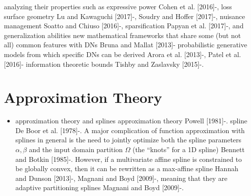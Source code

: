\documentclass{article}
\begin{document}
\begin{itemize}
		\subitem analyzing their properties such as expressive power Cohen et al. [2016]-\cite{balestriero_mad_2018}, loss surface geometry Lu and Kawaguchi [2017]-\cite{balestriero_mad_2018}, Soudry and Hoffer [2017]-\cite{balestriero_mad_2018}, nuisance management Soatto and Chiuso [2016]-\cite{balestriero_mad_2018}, sparsification Papyan et al. [2017]-\cite{balestriero_mad_2018}, and generalization abilities
		\subitem new mathematical frameworks that share some (but not all) common features with DNs Bruna and Mallat [2013]-\cite{balestriero_mad_2018}
		\subitem probabilistic generative models from which specific DNs can be derived Arora et al. [2013]-\cite{balestriero_mad_2018}, Patel et al. [2016]-\cite{balestriero_mad_2018}
		\subitem information theoretic bounds Tishby and Zaslavsky [2015]-\cite{balestriero_mad_2018}.
\end{itemize}


\section{Approximation Theory}

\begin{itemize}
	\item approximation theory and splines
		\subitem approximation theory Powell [1981]-\cite{balestriero_mad_2018}. spline De Boor et al. [1978]-\cite{balestriero_mad_2018}. A major complication of function approximation with splines in general is the need to jointly optimize both the spline parameters $\alpha, \beta$ and the input domain partition $\Omega$ (the ``knots'' for a 1D spline) Bennett and Botkin [1985]-\cite{balestriero_mad_2018}. However, if a multivariate affine spline is constrained to be globally convex, then it can be rewritten as a max-affine spline Hannah and Dunson [2013]-\cite{balestriero_mad_2018}, Magnani and Boyd [2009]-\cite{balestriero_mad_2018}, meaning that they are adaptive partitioning splines Magnani and Boyd [2009]-\cite{balestriero_mad_2018}.
\end{itemize}







\end{document}
